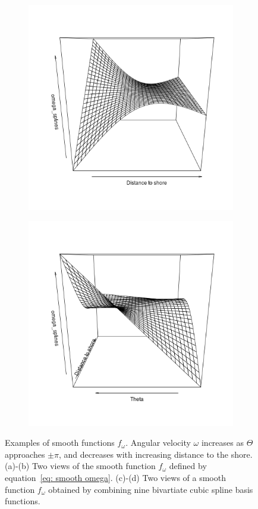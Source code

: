 \documentclass[11pt]{article}
\newcommand {\1}{\mathbb{1}}
\begin{document}
\begin{figure}[H]
	\begin{subfigure}{0.48\textwidth}
	\centering
	\includegraphics[scale=0.3]{images/crcvm/smooth_splines_omega1.png}
	\caption{}
	\label{fig: smoothomegasplines1}
	\end{subfigure}
	\begin{subfigure}{0.48\textwidth}
	\centering
	\includegraphics[scale=0.3]{images/crcvm/smooth_splines_omega2.png}
	\caption{}
	\label{fig: smoothomegasplines2}
	\end{subfigure}
	\caption{Examples of smooth functions $f_{\omega}$. Angular velocity $\omega$ increases as $\Theta$ approaches $\pm\pi$, and decreases with increasing distance to the shore. (a)-(b) Two views of the smooth function $f_{\omega}$ defined by equation~\ref{eq: smooth omega}. (c)-(d) Two views of a smooth function $f_{\omega}$ obtained by combining nine bivartiate cubic spline basis functions.}
	
\end{figure}
\end{document}
